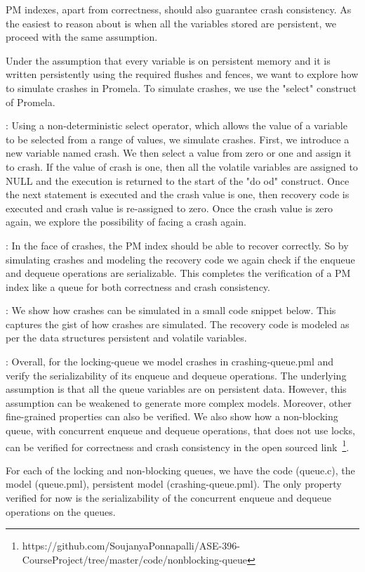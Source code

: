 PM indexes, apart from correctness, should also guarantee crash consistency.
As the easiest to reason about is when all the variables stored are persistent,
we proceed with the same assumption.

Under the assumption that every variable is on persistent memory and it is written
persistently using the required flushes and fences, we want to explore how to
simulate crashes in Promela. To simulate crashes, we use the "select" construct
of Promela.

: Using a non-deterministic select operator, which allows the
value of a variable to be selected from a range of values, we simulate crashes.
First, we introduce a new variable named crash. We then select a value from zero
or one and assign it to crash. If the value of crash is one, then all the volatile
variables are assigned to NULL and the execution is returned to the start of the
"do od" construct. Once the next statement is executed and the crash value is one,
then recovery code is executed and crash value is re-assigned to zero. Once the crash
value is zero again, we explore the possibility of facing a crash again.

: In the face of crashes, the PM index should be
able to recover correctly. So by simulating crashes and modeling the recovery code
we again check if the enqueue and dequeue operations are serializable. This completes
the verification of a PM index like a queue for both correctness and crash consistency.

: We show how crashes can be simulated in a small code snippet
below. This captures the gist of how crashes are simulated. The recovery code is modeled
as per the data structures persistent and volatile variables.



: Overall, for the locking-queue
we model crashes in crashing-queue.pml and verify the serializability of its
enqueue and dequeue operations. The underlying
assumption is that all the queue variables are on persistent data. However, this assumption
can be weakened to generate more complex models. Moreover, other fine-grained properties
can also be verified. We also show how a non-blocking queue, with concurrent enqueue
and dequeue operations, that does not use locks, can be verified for correctness and crash
consistency in the open sourced link~\footnote{https://github.com/SoujanyaPonnapalli/ASE-396-CourseProject/tree/master/code/nonblocking-queue}.

For each of the locking and non-blocking queues, we have the code (queue.c),
the model (queue.pml), persistent model (crashing-queue.pml). The only property
verified for now is the serializability of the concurrent enqueue and dequeue
operations on the queues.
